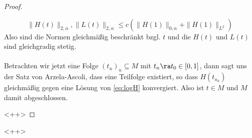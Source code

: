 \begin{proof}
\begin{itemize}
      \[
      \|H(t)\|_{2, \alpha}, \|L(t)\|_{2, \alpha} \leq c ( \|H(1)\|_{0, \alpha} + \|H(1)\|_{L^2})
      \]
      Also sind die Normen gleichmäßig beschränkt bzgl. $t$ und die $H(t)$ und $L(t)$ sind gleichgradig stetig. \\
      \\
      Betrachten wir jetzt eine Folge $(t_n)_n \subseteq M$ mit $t_n \ra t_0 \in [0,1]$, dann sagt uns der Satz von Arzela-Ascoli, dass eine Teilfolge existiert, so dass $H(t_{n_k})$ gleichmäßig gegen eine Lösung von \eqref{eq:logH} konvergiert. Also ist $t \in M$ und $M$ damit abgeschlossen.


  \end{itemize}<++>
\end{proof}<++>
